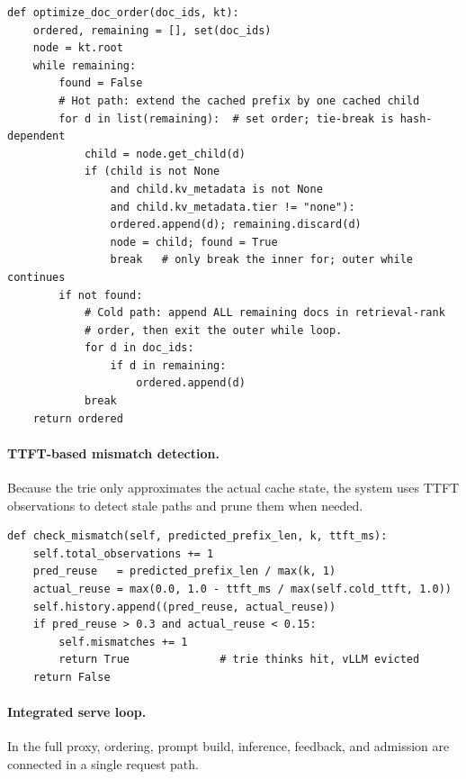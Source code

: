 \documentclass{article}
\begin{document}
\begin{lstlisting}[caption={Greedy ordering (\texttt{prompt\_builder.py}). \texttt{remaining} is a \texttt{set}; when multiple cached children exist at one trie level the iteration order is Python-hash-dependent (ties are rare in practice---the trie typically has one matching child per level). The cold-path loop appends every remaining document in retrieval-rank order (matching Algorithm~\ref{alg:ordering}).},label={lst:order}]
def optimize_doc_order(doc_ids, kt):
    ordered, remaining = [], set(doc_ids)
    node = kt.root
    while remaining:
        found = False
        # Hot path: extend the cached prefix by one cached child
        for d in list(remaining):  # set order; tie-break is hash-dependent
            child = node.get_child(d)
            if (child is not None
                and child.kv_metadata is not None
                and child.kv_metadata.tier != "none"):
                ordered.append(d); remaining.discard(d)
                node = child; found = True
                break   # only break the inner for; outer while continues
        if not found:
            # Cold path: append ALL remaining docs in retrieval-rank
            # order, then exit the outer while loop.
            for d in doc_ids:
                if d in remaining:
                    ordered.append(d)
            break
    return ordered
\end{lstlisting}

\paragraph{TTFT-based mismatch detection.} Because the trie only approximates the actual cache state, the system uses TTFT observations to detect stale paths and prune them when needed.

\begin{lstlisting}[caption={Cache-state feedback (\texttt{serving.py}).},label={lst:feedback}]
def check_mismatch(self, predicted_prefix_len, k, ttft_ms):
    self.total_observations += 1
    pred_reuse   = predicted_prefix_len / max(k, 1)
    actual_reuse = max(0.0, 1.0 - ttft_ms / max(self.cold_ttft, 1.0))
    self.history.append((pred_reuse, actual_reuse))
    if pred_reuse > 0.3 and actual_reuse < 0.15:
        self.mismatches += 1
        return True              # trie thinks hit, vLLM evicted
    return False
\end{lstlisting}

\paragraph{Integrated serve loop.} In the full proxy, ordering, prompt build, inference, feedback, and admission are connected in a single request path.
\end{document}
